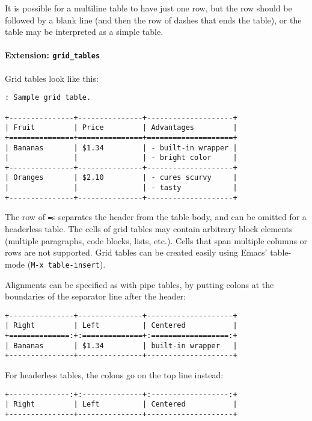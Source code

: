 \documentclass[
]{article}
\begin{document}
It is possible for a multiline table to have just one row, but the row
should be followed by a blank line (and then the row of dashes that ends
the table), or the table may be interpreted as a simple table.

\paragraph{\texorpdfstring{Extension:
\texttt{grid\_tables}}{Extension: grid\_tables}}\label{extension-grid_tables}

Grid tables look like this:

\begin{verbatim}
: Sample grid table.

+---------------+---------------+--------------------+
| Fruit         | Price         | Advantages         |
+===============+===============+====================+
| Bananas       | $1.34         | - built-in wrapper |
|               |               | - bright color     |
+---------------+---------------+--------------------+
| Oranges       | $2.10         | - cures scurvy     |
|               |               | - tasty            |
+---------------+---------------+--------------------+
\end{verbatim}

The row of \texttt{=}s separates the header from the table body, and can
be omitted for a headerless table. The cells of grid tables may contain
arbitrary block elements (multiple paragraphs, code blocks, lists,
etc.). Cells that span multiple columns or rows are not supported. Grid
tables can be created easily using Emacs' table-mode
(\texttt{M-x\ table-insert}).

Alignments can be specified as with pipe tables, by putting colons at
the boundaries of the separator line after the header:

\begin{verbatim}
+---------------+---------------+--------------------+
| Right         | Left          | Centered           |
+==============:+:==============+:==================:+
| Bananas       | $1.34         | built-in wrapper   |
+---------------+---------------+--------------------+
\end{verbatim}

For headerless tables, the colons go on the top line instead:

\begin{verbatim}
+--------------:+:--------------+:------------------:+
| Right         | Left          | Centered           |
+---------------+---------------+--------------------+
\end{verbatim}
\end{document}
